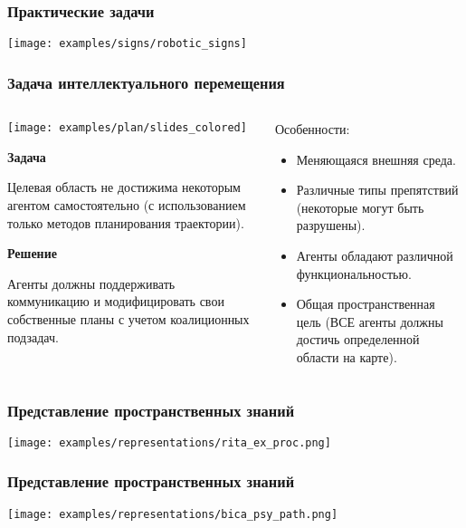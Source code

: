 \documentclass[default]{beamer}
\begin{document}
	\begin{frame}
		\frametitle{Практические задачи}
		
		\centering
		\texttt{[image: examples/signs/robotic\_signs]}
		
	\end{frame}

	\begin{frame}
		\frametitle{Задача интеллектуального перемещения}
		
		\begin{columns}
		\begin{column}{0.55\textwidth}
		\begin{center}
		\texttt{[image: examples/plan/slides\_colored]}
		\end{center}
		\vspace{-7pt}
		\small
		\textbf{Задача}
		
		Целевая область не достижима некоторым агентом самостоятельно (с использованием только методов планирования траектории).
		
		\textbf{Решение}
		
		Агенты должны поддерживать коммуникацию и модифицировать свои собственные планы с учетом коалиционных подзадач.
		
		\end{column}
		\begin{column}{0.45\textwidth}
		Особенности:
		\begin{itemize}
		\item Меняющаяся внешняя среда.
		\item Различные типы препятствий (некоторые могут быть разрушены).
		\item Агенты обладают различной функциональностью.
		\item Общая пространственная цель (ВСЕ агенты должны достичь определенной области на карте).
		\end{itemize}
		\end{column}
		\end{columns}
	\end{frame}

	\begin{frame}
		\frametitle{Представление пространственных знаний}
	
		\texttt{[image: examples/representations/rita\_ex\_proc.png]}
	
	\end{frame}

	\begin{frame}
		\frametitle{Представление пространственных знаний}
	
		\texttt{[image: examples/representations/bica\_psy\_path.png]}

	\end{frame}	
\end{document}
